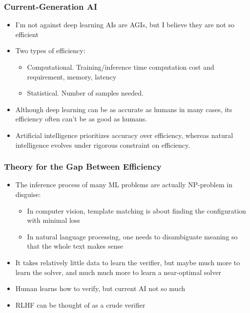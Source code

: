\documentclass{beamer}   	%
\theoremstyle{definition}
\begin{document}
\begin{frame}
\frametitle{Current-Generation AI}
\begin{itemize}
	\item I'm not against deep learning AIs are AGIs, but I believe they are not so efficient
	\item Two types of efficiency:
	\begin{itemize}
		\item Computational. Training/inference time computation cost and requirement, memory, latency
		\item Statistical. Number of samples needed.
	\end{itemize}
	\item Although deep learning can be as accurate as humans in many cases, its efficiency often can't be as good as humans.
	\item Artificial intelligence prioritizes accuracy over efficiency, whereas natural intelligence evolves under rigorous constraint on efficiency.
\end{itemize}
\end{frame}

\begin{frame}
\frametitle{Theory for the Gap Between Efficiency}
\begin{itemize}
	\item The inference process of many ML problems are actually NP-problem in disguise:
	\begin{itemize}
		\item In computer vision, template matching is about finding the configuration with minimal loss
		\item In natural language processing, one needs to disambiguate meaning so that the whole text makes sense
	\end{itemize}
	\item It takes relatively little data to learn the verifier, but maybe much more to learn the solver, and much much more to learn a near-optimal solver
	\item Human learns how to verify, but current AI not so much
	\item RLHF can be thought of as a crude verifier
\end{itemize}
\end{frame}
\end{document}
